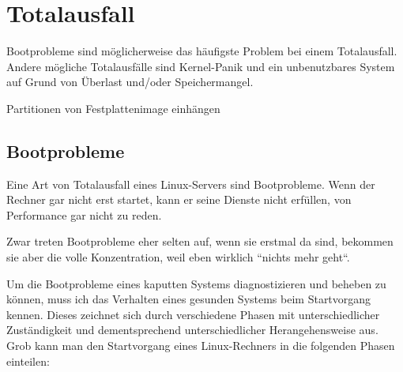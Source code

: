 \chapter{Totalausfall}
\label{cha:totalausfall}

\begin{abstractsec}
  Bootprobleme sind möglicherweise das häufigste Problem bei einem
  Totalausfall. Andere mögliche Totalausfälle sind Kernel-Panik und ein
  unbenutzbares System auf Grund von Überlast und/oder Speichermangel.
\end{abstractsec}

\begin{notes}
\item Partitionen von Festplattenimage einhängen
\end{notes}

\section{Bootprobleme}
\label{sec:lokal-bootprobleme}

Eine Art von Totalausfall eines Linux-Servers sind Bootprobleme. Wenn der
Rechner gar nicht erst startet, kann er seine Dienste nicht erfüllen, von
Performance gar nicht zu reden.

Zwar treten Bootprobleme eher selten auf, wenn sie erstmal da sind, bekommen
sie aber die volle Konzentration, weil eben wirklich ``nichts mehr geht``.

Um die Bootprobleme eines kaputten Systems diagnostizieren und beheben zu
können, muss ich das Verhalten eines gesunden Systems beim Startvorgang
kennen. Dieses zeichnet sich durch verschiedene Phasen mit unterschiedlicher
Zuständigkeit und dementsprechend unterschiedlicher Herangehensweise aus. Grob
kann man den Startvorgang eines Linux-Rechners in die folgenden Phasen
einteilen:

